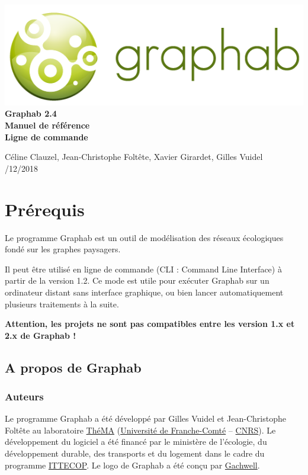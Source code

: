 \documentclass[a4paper,10pt]{report}
\begin{document}
 \begin{titlepage}
 	
 	\centering
 	\includegraphics[scale=0.5]{img/logo.png}\\
 	
 	\bigskip
 	\bigskip
 	\bigskip	
 	{\Huge
 		\bfseries
 		Graphab 2.4\\
 		\bigskip
 		Manuel de référence\\
 		Ligne de commande\\
 	}
 	\bigskip
 	\bigskip
 	\bigskip
 	\bigskip
 	\bigskip
 	
 	{\Large		
 		Céline Clauzel, Jean-Christophe Foltête, Xavier Girardet, Gilles Vuidel\\
 		/12/2018\\
 	}
 	
 \end{titlepage}




\tableofcontents

\chapter{Prérequis}

Le programme Graphab est un outil de modélisation des réseaux écologiques fondé sur les graphes paysagers.

Il peut être utilisé en ligne de commande (CLI : Command Line Interface) à partir de la version 1.2. Ce mode est utile pour exécuter Graphab sur un ordinateur distant sans interface graphique, ou bien lancer automatiquement plusieurs traitements à la suite.

\textbf{Attention, les projets ne sont pas compatibles entre les version 1.x et 2.x de Graphab !}

\section{A propos de Graphab}

\subsection{Auteurs}
Le programme Graphab a été développé par Gilles Vuidel et Jean-Christophe Foltête au laboratoire \href{http://thema.univ-fcomte.fr}{ThéMA} (\href{http://www.univ-fcomte.fr}{Université de Franche-Comté} – \href{http://www.cnrs.fr}{CNRS}). Le développement du logiciel a été financé par le ministère de l'écologie, du développement durable, des transports et du logement dans le cadre du programme \href{http://www.ittecop.fr/}{ITTECOP}. Le logo de Graphab a été conçu par \href{http://www.gachwell.com/}{Gachwell}. 
\end{document}
